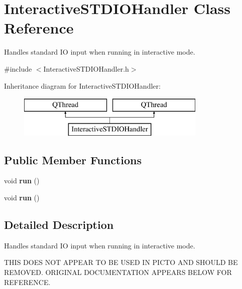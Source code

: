 \hypertarget{class_interactive_s_t_d_i_o_handler}{\section{Interactive\-S\-T\-D\-I\-O\-Handler Class Reference}
\label{class_interactive_s_t_d_i_o_handler}
}


Handles standard I\-O input when running in interactive mode.  




{\ttfamily \#include $<$Interactive\-S\-T\-D\-I\-O\-Handler.\-h$>$}

Inheritance diagram for Interactive\-S\-T\-D\-I\-O\-Handler\-:\begin{figure}[H]
\begin{center}
\leavevmode
\includegraphics[height=2.000000cm]{class_interactive_s_t_d_i_o_handler}
\end{center}
\end{figure}
\subsection*{Public Member Functions}
\begin{DoxyCompactItemize}
\item 
\hypertarget{class_interactive_s_t_d_i_o_handler_a3bec378f779c7371350801de2c1c07e7}{void {\bfseries run} ()}\label{class_interactive_s_t_d_i_o_handler_a3bec378f779c7371350801de2c1c07e7}

\item 
\hypertarget{class_interactive_s_t_d_i_o_handler_a3bec378f779c7371350801de2c1c07e7}{void {\bfseries run} ()}\label{class_interactive_s_t_d_i_o_handler_a3bec378f779c7371350801de2c1c07e7}

\end{DoxyCompactItemize}


\subsection{Detailed Description}
Handles standard I\-O input when running in interactive mode. 

T\-H\-I\-S D\-O\-E\-S N\-O\-T A\-P\-P\-E\-A\-R T\-O B\-E U\-S\-E\-D I\-N P\-I\-C\-T\-O A\-N\-D S\-H\-O\-U\-L\-D B\-E R\-E\-M\-O\-V\-E\-D. O\-R\-I\-G\-I\-N\-A\-L D\-O\-C\-U\-M\-E\-N\-T\-A\-T\-I\-O\-N A\-P\-P\-E\-A\-R\-S B\-E\-L\-O\-W F\-O\-R R\-E\-F\-E\-R\-E\-N\-C\-E.

